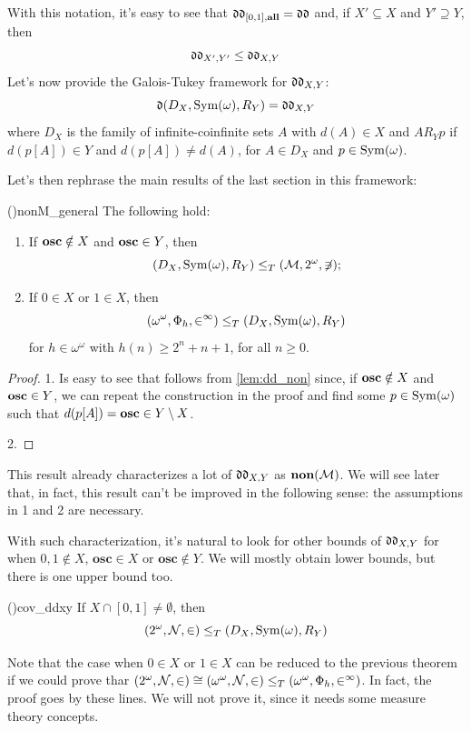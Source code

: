 With this notation, it's easy to see that $\mathfrak{dd}_{[0,1],\textbf{all}}=\mathfrak{dd}$ and, if $X'\subseteq X$ and $Y'\supseteq Y$, then
$$\mathfrak{dd}_{X',Y'}\leq\mathfrak{dd}_{X,Y}$$
Let's now provide the Galois-Tukey framework for $\mathfrak{dd}_{X,Y}$:
$$\mathfrak{d}(D_X,\mathrm{Sym}(\omega),R_Y)=\mathfrak{dd}_{X,Y}$$
where $D_X$ is the family of infinite-coinfinite sets $A$ with $d(A)\in X$ and $AR_Yp$ if $d(p[A])\in Y$ and $d(p[A])\neq d(A)$, for $A\in D_X$ and $p\in\mathrm{Sym}(\omega)$.

Let's then rephrase the main results of the last section in this framework:

\begin{theorem}{(\cite{brech})}{nonM_general}
    The following hold:
    \begin{enumerate}
        \item If $\mathbf{osc}\notin X$ and $\mathbf{osc}\in Y$, then
        $$(D_X,\mathrm{Sym}(\omega),R_Y)\leq_T(\mathcal{M},2^\omega,\not\ni);$$
        \item If $0\in X$ or $1\in X$, then
        $$(\omega^\omega,\Phi_h,\in^\infty)\leq_T(D_X,\mathrm{Sym}(\omega),R_Y)$$
        for $h\in\omega^\omega$ with $h(n)\geq 2^n+n+1$, for all $n\geq0$.
    \end{enumerate}
\end{theorem}

\begin{proof}
    1. Is easy to see that follows from \cref{lem:dd_non} since, if $\mathbf{osc}\notin X$ and $\mathbf{osc}\in Y$, we can repeat the construction in the proof and find some $p\in\mathrm{Sym}(\omega)$ such that $d(p[A])=\mathbf{osc}\in Y\setminus X$.

    2.
\end{proof}

This result already characterizes a lot of $\mathfrak{dd}_{X,Y}$ as $\textbf{non}(\mathcal{M})$. We will see later that, in fact, this result can't be improved in the following sense: the assumptions in 1 and 2 are necessary.

With such characterization, it's natural to look for other bounds of $\mathfrak{dd}_{X,Y}$ for when $0,1\notin X$, $\mathbf{osc}\in X$ or $\mathbf{osc}\notin Y$. We will mostly obtain lower bounds, but there is one upper bound too.

\begin{theorem}{(\cite{brech})}{cov_ddxy}
    If $X\cap[0,1]\neq\emptyset$, then
    $$(2^\omega,\mathcal{N},\in)\leq_T(D_X,\mathrm{Sym}(\omega),R_Y)$$
\end{theorem}

Note that the case when $0\in X$ or $1\in X$ can be reduced to the previous theorem if we could prove thar $(2^\omega,\mathcal{N},\in)\cong(\omega^\omega,\mathcal{N},\in)\leq_T(\omega^\omega,\Phi_h,\in^\infty)$. In fact, the proof goes by these lines. We will not prove it, since it needs some measure theory concepts.

